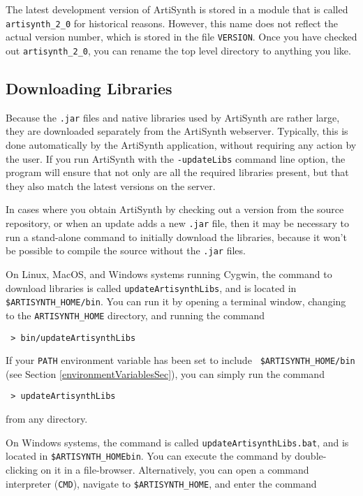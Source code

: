 \documentclass{article}
\begin{document}
\begin{sideblock}
The latest development version of ArtiSynth is stored in a module that
is called {\tt artisynth\_2\_0} for historical reasons. However, this
name does not reflect the actual version number, which is stored
in the file {\tt VERSION}. Once you have checked out {\tt artisynth\_2\_0},
you can rename the top level directory to anything you like.
\end{sideblock}

\subsection{Downloading Libraries}
\label{LibUpdateSec}

Because the {\tt .jar} files and native libraries used by ArtiSynth
are rather large, they are downloaded separately from the ArtiSynth
webserver. Typically, this is done automatically by the ArtiSynth
application, without requiring any action by the user.  If you run
ArtiSynth with the {\tt -updateLibs} command line option, the program
will ensure that not only are all the required libraries present, but
that they also match the latest versions on the server.

In cases where you obtain ArtiSynth by checking out a version from the
source repository, or when an update adds a new {\tt .jar} file, then
it may be necessary to run a stand-alone command to initially download
the libraries, because it won't be possible to compile the source
without the {\tt .jar} files.

On Linux, MacOS, and Windows systems running Cygwin, the command to
download libraries is called {\tt updateArtisynthLibs}, and is
located in {\tt \$ARTISYNTH\_HOME/bin}. You can run it by opening a
terminal window, changing to the {\tt ARTISYNTH\_HOME} directory, and
running the command

\begin{verbatim}
 > bin/updateArtisynthLibs
\end{verbatim}

If your {\tt PATH} environment variable has been set to include {\tt
\$ARTISYNTH\_HOME/bin} (see Section \ref{environmentVariablesSec}), you
can simply run the command

\begin{verbatim}
 > updateArtisynthLibs
\end{verbatim}

from any directory.

On Windows systems, the command
is called {\tt updateArtisynthLibs.bat}, and is located
in {\tt \$ARTISYNTH\_HOME\BKS bin}. You can execute the command
by double-clicking on it in a file-browser.
Alternatively, you can open a command interpreter ({\tt CMD}), navigate
to {\tt \$ARTISYNTH\_HOME}, and enter the command
\end{document}

